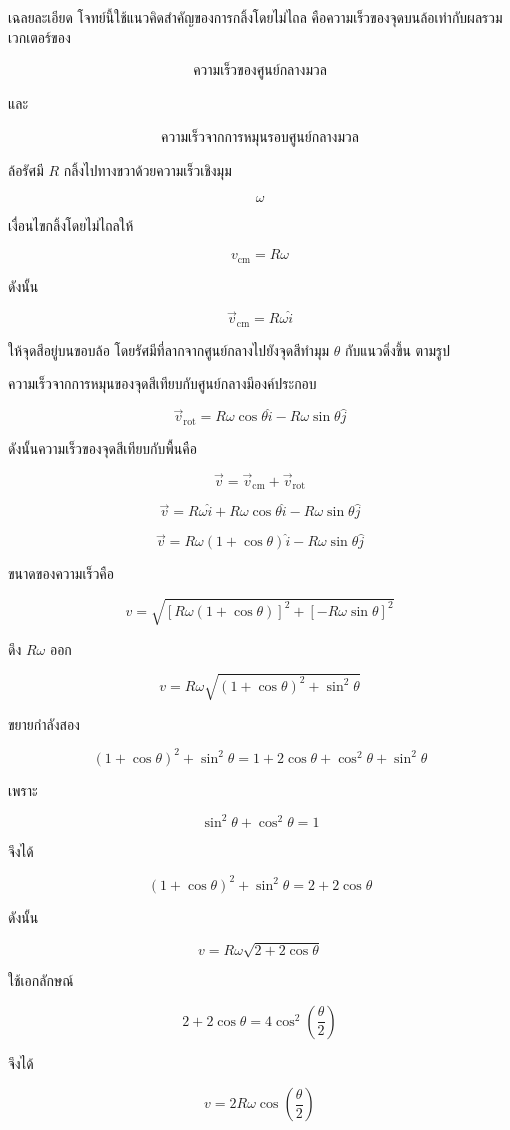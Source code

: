 \begin{examplebox}{เฉลยละเอียด}
โจทย์นี้ใช้แนวคิดสำคัญของการกลิ้งโดยไม่ไถล คือความเร็วของจุดบนล้อเท่ากับผลรวมเวกเตอร์ของ

\[
\text{ความเร็วของศูนย์กลางมวล}
\]

และ

\[
\text{ความเร็วจากการหมุนรอบศูนย์กลางมวล}
\]

ล้อรัศมี \(R\) กลิ้งไปทางขวาด้วยความเร็วเชิงมุม

\[
\omega
\]

เงื่อนไขกลิ้งโดยไม่ไถลให้

\[
v_{\text{cm}}=R\omega
\]

ดังนั้น

\[
\vec{v}_{\text{cm}}=R\omega\hat{i}
\]

ให้จุดสีอยู่บนขอบล้อ โดยรัศมีที่ลากจากศูนย์กลางไปยังจุดสีทำมุม \(\theta\) กับแนวดิ่งขึ้น ตามรูป

ความเร็วจากการหมุนของจุดสีเทียบกับศูนย์กลางมีองค์ประกอบ

\[
\vec{v}_{\text{rot}}
=
R\omega\cos\theta\hat{i}
-
R\omega\sin\theta\hat{j}
\]

ดังนั้นความเร็วของจุดสีเทียบกับพื้นคือ

\[
\vec{v}
=
\vec{v}_{\text{cm}}+\vec{v}_{\text{rot}}
\]

\[
\vec{v}
=
R\omega\hat{i}
+
R\omega\cos\theta\hat{i}
-
R\omega\sin\theta\hat{j}
\]

\[
\vec{v}
=
R\omega(1+\cos\theta)\hat{i}
-
R\omega\sin\theta\hat{j}
\]

ขนาดของความเร็วคือ

\[
v=
\sqrt{
\left[R\omega(1+\cos\theta)\right]^2
+
\left[-R\omega\sin\theta\right]^2
}
\]

ดึง \(R\omega\) ออก

\[
v=R\omega
\sqrt{(1+\cos\theta)^2+\sin^2\theta}
\]

ขยายกำลังสอง

\[
(1+\cos\theta)^2+\sin^2\theta
=
1+2\cos\theta+\cos^2\theta+\sin^2\theta
\]

เพราะ

\[
\sin^2\theta+\cos^2\theta=1
\]

จึงได้

\[
(1+\cos\theta)^2+\sin^2\theta
=
2+2\cos\theta
\]

ดังนั้น

\[
v=R\omega\sqrt{2+2\cos\theta}
\]

ใช้เอกลักษณ์

\[
2+2\cos\theta=4\cos^2\left(\frac{\theta}{2}\right)
\]

จึงได้

\[
\boxed{v=2R\omega\cos\left(\frac{\theta}{2}\right)}
\]
\end{examplebox}

